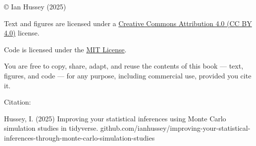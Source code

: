 \documentclass[
  letterpaper,
  DIV=11,
  numbers=noendperiod]{scrreprt}
\begin{document}
© Ian Hussey (2025)

Text and figures are licensed under a
\href{https://creativecommons.org/licenses/by/4.0/}{Creative Commons
Attribution 4.0 (CC BY 4.0)} license.

Code is licensed under the
\href{https://opensource.org/licenses/MIT}{MIT License}.

You are free to copy, share, adapt, and reuse the contents of this book
--- text, figures, and code --- for any purpose, including commercial
use, provided you cite it.

Citation:

Hussey, I. (2025) Improving your statistical inferences using Monte
Carlo simulation studies in tidyverse.
github.com/ianhussey/improving-your-statistical-inferences-through-monte-carlo-simulation-studies
\end{document}
